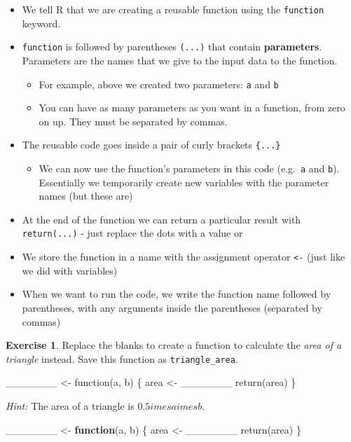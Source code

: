 \documentclass[
]{article}
\newenvironment{Shaded}{\begin{snugshade}}{\end{snugshade}}
\newcommand{\ControlFlowTok}[1]{\textcolor[rgb]{0.13,0.29,0.53}{\textbf{#1}}}
\newcommand{\FunctionTok}[1]{\textcolor[rgb]{0.00,0.00,0.00}{#1}}
\newcommand{\NormalTok}[1]{#1}
\newcommand{\OtherTok}[1]{\textcolor[rgb]{0.56,0.35,0.01}{#1}}
\providecommand{\tightlist}{%
  \setlength{\itemsep}{0pt}\setlength{\parskip}{0pt}}
\theoremstyle{definition}
\theoremstyle{definition}
\theoremstyle{definition}
\newtheorem{exercise}{Exercise}[section]
\theoremstyle{definition}
\theoremstyle{remark}
\begin{document}
\begin{itemize}
\tightlist
\item
  We tell R that we are creating a reusable function using the \texttt{function} keyword.
\item
  \texttt{function} is followed by parentheses \texttt{(...)} that contain \textbf{parameters}. Parameters are the names that we give to the input data to the function.

  \begin{itemize}
  \tightlist
  \item
    For example, above we created two parameters: \texttt{a} and \texttt{b}
  \item
    You can have as many parameters as you want in a function, from zero on up. They must be separated by commas.
  \end{itemize}
\item
  The reusable code goes inside a pair of curly brackets \texttt{\{...\}}

  \begin{itemize}
  \tightlist
  \item
    We can now use the function's parameters in this code (e.g.~\texttt{a} and \texttt{b}). Essentially we temporarily create new variables with the parameter names (but these are)
  \end{itemize}
\item
  At the end of the function we can return a particular result with \texttt{return(...)} - just replace the dots with a value or
\item
  We store the function in a name with the assignment operator \texttt{\textless{}-} (just like we did with variables)
\item
  When we want to run the code, we write the function name followed by parentheses, with any arguments inside the parentheses (separated by commas)
\end{itemize}

\begin{exercise}
Replace the blanks to create a function to calculate the \emph{area of a triangle} instead. Save this function as \texttt{triangle\_area}.

\_\_\_\_\_\_\_ \textless- function(a, b) \{
area \textless- \_\_\_\_\_\_\_
return(area)
\}

\emph{Hint:} The area of a triangle is \(0.5 imes a imes b\).
\end{exercise}

\begin{Shaded}
\begin{Highlighting}[]
\NormalTok{\_\_\_\_\_\_\_ }\OtherTok{\textless{}{-}} \ControlFlowTok{function}\NormalTok{(a, b) \{}
\NormalTok{  area }\OtherTok{\textless{}{-}}\NormalTok{ \_\_\_\_\_\_\_}
  \FunctionTok{return}\NormalTok{(area)}
\NormalTok{\}}
\end{Highlighting}
\end{Shaded}
\end{document}
